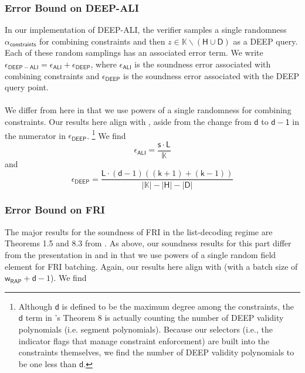 \documentclass[10pt,letterpaper,titlepage]{article}
\theoremstyle{definition}
\begin{document}
\subsubsection{Error Bound on DEEP-ALI}
In our implementation of DEEP-ALI, the verifier samples a single randomness $\alpha_\mathsf{constraints}$ for combining constraints and then $z\in\mathbb{K}\backslash(\mathsf{H}\cup\mathsf{D})$ as a DEEP query.
Each of these random samplings has an associated error term.
We write $\epsilon_\mathsf{DEEP-ALI} = \epsilon_\mathsf{ALI} + \epsilon_\mathsf{DEEP}$,
where $\epsilon_\mathsf{ALI}$ is the soundness error associated with combining constraints
and $\epsilon_\mathsf{DEEP}$ is the soundness error associated with the DEEP query point. \\
\\
We differ from \cite{ethSTARK} here in that we use powers of a single randomness for combining constraints.
Our results here align with \cite{FRIsummary}, aside from the change from $\mathsf{d}$ to $\mathsf{d-1}$ in the numerator in $\epsilon_\mathsf{DEEP}$.%
\footnote{
  Although $\mathsf{d}$ is defined to be the maximum degree among the constraints, the $\mathsf{d}$ term in \cite{FRIsummary}'s Theorem 8 is actually counting the number of DEEP validity polynomials (i.e. segment polynomials).
  Because our selectors (i.e., the indicator flags that manage constraint enforcement) are built into the constraints themselves, we find the number of DEEP validity polynomials to be one less than $\mathsf{d}$.
}
We find
\[
  \epsilon_\mathsf{ALI} =
  \frac{\mathsf{s}\cdot \mathsf{L}}{\mathbb{K}}
\]
and
\[
  \epsilon_\mathsf{DEEP} =
  \frac{
    \mathsf{L}\cdot(\mathsf{d}-1)((\mathsf{k}+1)+(\mathsf{k}-1))}
    {|\mathbb{K}|-|\mathsf{H}|-|\mathsf{D}|}
\]
\subsubsection{Error Bound on FRI}
The major results for the soundness of FRI in the list-decoding regime are Theorems 1.5 and 8.3 from \cite{proxGaps}.
As above, our soundness results for this part differ from the presentation in \cite{proxGaps} and \cite{ethSTARK} in that we use powers of a single random field element for FRI batching.
Again, our results here align with \cite{FRIsummary} (with a batch size of $\mathsf{w_{RAP}}+\mathsf{d}-1$). We find
\end{document}
